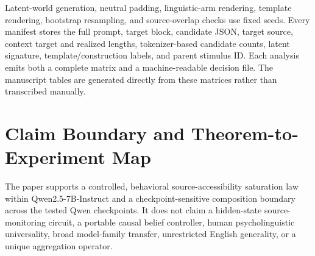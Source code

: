 Latent-world generation, neutral padding, linguistic-arm rendering, template
rendering, bootstrap resampling, and source-overlap checks use fixed seeds.
Every manifest stores the full prompt, target block, candidate JSON, target
source, context target and realized lengths, tokenizer-based candidate counts,
latent signature, template/construction labels, and parent stimulus ID. Each
analysis emits both a complete matrix and a machine-readable decision file.
The manuscript tables are generated directly from these matrices rather than
transcribed manually.

\section{Claim Boundary and Theorem-to-Experiment Map}

The paper supports a controlled, behavioral source-accessibility saturation law
within Qwen2.5-7B-Instruct and a checkpoint-sensitive composition boundary
across the tested Qwen checkpoints.
It does not claim a hidden-state source-monitoring circuit, a portable causal
belief controller, human psycholinguistic universality, broad model-family
transfer, unrestricted English generality, or a unique aggregation operator.

